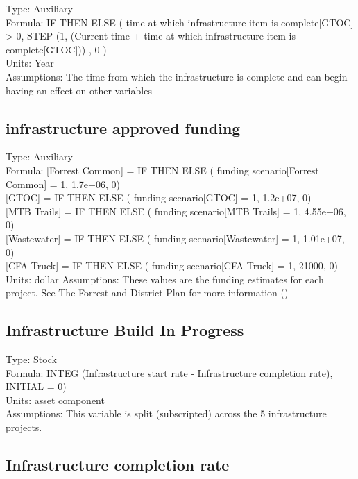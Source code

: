 \documentclass[
  11pt,
]{book}
\begin{document}
Type: Auxiliary\\
Formula: IF THEN ELSE ( time at which infrastructure item is complete{[}GTOC{]} \textgreater{} 0, STEP (1, (Current time + time at which infrastructure item is complete{[}GTOC{]})) , 0 )\\
Units: Year\\
Assumptions: The time from which the infrastructure is complete and can begin having an effect on other variables

\hypertarget{infrastructure-approved-funding}{%
\subsection{infrastructure approved funding}\label{infrastructure-approved-funding}}

Type: Auxiliary\\
Formula: {[}Forrest Common{]} = IF THEN ELSE ( funding scenario{[}Forrest Common{]} = 1, 1.7e+06, 0)\\
{[}GTOC{]} = IF THEN ELSE ( funding scenario{[}GTOC{]} = 1, 1.2e+07, 0)\\
{[}MTB Trails{]} = IF THEN ELSE ( funding scenario{[}MTB Trails{]} = 1, 4.55e+06, 0)\\
{[}Wastewater{]} = IF THEN ELSE ( funding scenario{[}Wastewater{]} = 1, 1.01e+07, 0)\\
{[}CFA Truck{]} = IF THEN ELSE ( funding scenario{[}CFA Truck{]} = 1, 21000, 0)
Units: dollar
Assumptions: These values are the funding estimates for each project. See The Forrest and District Plan for more information (\citet{szetey_forrest_2020})

\hypertarget{infrastructure-build-in-progress}{%
\subsection{Infrastructure Build In Progress}\label{infrastructure-build-in-progress}}

Type: Stock\\
Formula: INTEG (Infrastructure start rate - Infrastructure completion rate), INITIAL = 0)\\
Units: asset component\\
Assumptions: This variable is split (subscripted) across the 5 infrastructure projects.

\hypertarget{infrastructure-completion-rate}{%
\subsection{Infrastructure completion rate}\label{infrastructure-completion-rate}}
\end{document}
